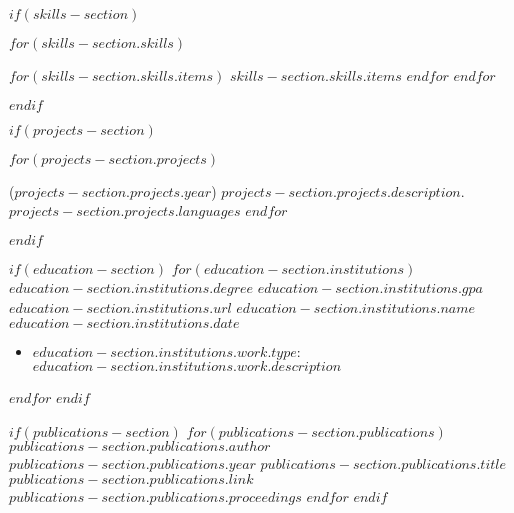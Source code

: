 $if(skills-section)$
\vspace{-13pt}
\begin{description}[align=right,labelwidth=\skillswidth]
\setlength\itemsep{-2pt}
$for(skills-section.skills)$
    \item [$skills-section.skills.heading$:]
    \commasep{\ensuremath{\cdot}}
    $for(skills-section.skills.items)$
        $skills-section.skills.items$
    $endfor$
    \endcommasep
$endfor$
\end{description}
$endif$

$if(projects-section)$
\vspace{-15pt}
\begin{description}[align=left]
\setlength\itemsep{0pt}
$for(projects-section.projects)$
\item
[$projects-section.projects.name$]
($projects-section.projects.year$)
$projects-section.projects.description$.
$projects-section.projects.languages$
$endfor$
\end{description}
\vspace{-10pt}
$endif$

$if(education-section)$
$for(education-section.institutions)$
    \education
    {$education-section.institutions.degree$}
    {$education-section.institutions.gpa$}
    {$education-section.institutions.url$}
    {$education-section.institutions.name$}
    {$education-section.institutions.date$}
    \begin{itemize}
    \setlength\itemsep{0pt}
    \item
      $education-section.institutions.work.type$:
      $education-section.institutions.work.description$
    \end{itemize}
$endfor$
$endif$
\vspace{-15pt}

$if(publications-section)$
$for(publications-section.publications)$
\vspace{-15pt}
\publication
{$publications-section.publications.author$}
{$publications-section.publications.year$}
{$publications-section.publications.title$}
{$publications-section.publications.link$}
{$publications-section.publications.proceedings$}
$endfor$
$endif$



